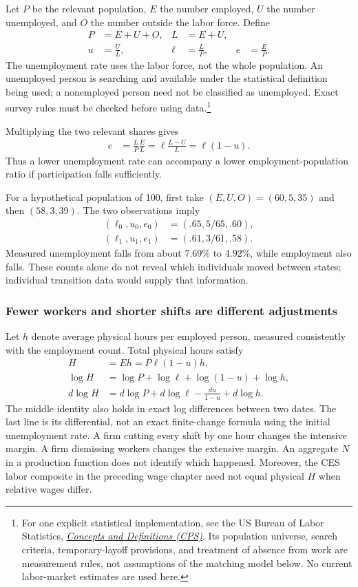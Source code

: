 Let $P$ be the relevant population, $E$ the number employed, $U$ the number
unemployed, and $O$ the number outside the labor force. Define
\begin{align}
 P&=E+U+O, & L&=E+U,\\
 u&=\frac UL, & \ell&=\frac LP, & e&=\frac EP.
\end{align}
The unemployment rate uses the labor force, not the whole population. An
unemployed person is searching and available under the statistical definition
being used; a nonemployed person need not be classified as unemployed.
Exact survey rules must be checked before using data.\footnote{For one explicit
statistical implementation, see the US Bureau of Labor Statistics,
\href{https://www.bls.gov/cps/definitions.htm}{\textit{Concepts and Definitions
(CPS)}}. Its population universe, search criteria, temporary-layoff provisions,
and treatment of absence from work are measurement rules, not assumptions of
the matching model below. No current labor-market estimates are used here.}

Multiplying the two relevant shares gives
\begin{align}
 e&=\frac LP\frac EL
   =\ell\frac{L-U}{L}
   =\ell(1-u).
\end{align}
Thus a lower unemployment rate can accompany a lower employment-population
ratio if participation falls sufficiently.

For a hypothetical population of 100, first take $(E,U,O)=(60,5,35)$ and then
$(58,3,39)$. The two observations imply
\begin{align}
 (\ell_0,u_0,e_0)&=(.65,5/65,.60),\\
 (\ell_1,u_1,e_1)&=(.61,3/61,.58).
\end{align}
Measured unemployment falls from about $7.69\%$ to $4.92\%$, while employment
also falls. These counts alone do not reveal which individuals moved between
states; individual transition data would supply that information.

\subsubsection{Fewer workers and shorter shifts are different adjustments}

Let $h$ denote average physical hours per employed person, measured consistently
with the employment count. Total physical hours satisfy
\begin{align}
 H&=Eh=P\ell(1-u)h,\\
 \log H&=\log P+\log\ell+\log(1-u)+\log h,\\
 d\log H&=d\log P+d\log\ell-\frac{du}{1-u}+d\log h.
\end{align}
The middle identity also holds in exact log differences between two dates.
The last line is its differential, not an exact finite-change formula using
the initial unemployment rate. A firm cutting every shift by one hour changes
the intensive margin. A firm dismissing workers changes the extensive margin.
An aggregate $N$ in a production function does not identify which happened.
Moreover, the CES labor composite in the preceding wage chapter need not equal
physical $H$ when relative wages differ.


